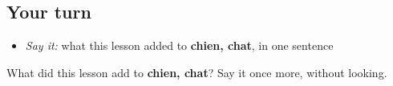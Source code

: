 \subsection*{Your turn}
\begin{itemize}
\raggedright
  \item \emph{Say it:} what this lesson added to \textbf{chien, chat}, in one sentence
\end{itemize}

\begin{tcolorbox}[breakable,colback=teal!4,colframe=teal!35!black,title={Before you move on}]
What did this lesson add to \textbf{chien, chat}? Say it once more, without looking.
\end{tcolorbox}
